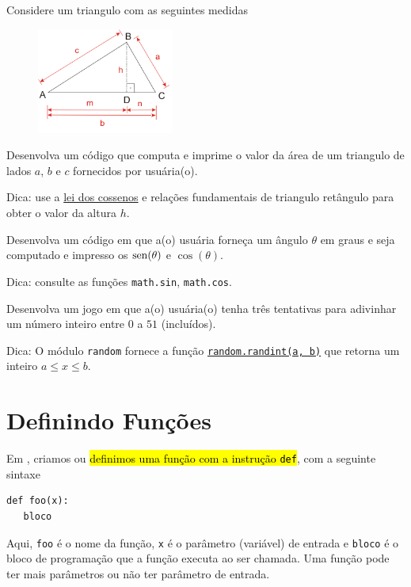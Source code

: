\begin{exer}
  Considere um triangulo com as seguintes medidas
  \begin{figure}[H]
    \centering
    \includegraphics[width=0.4\textwidth]{./cap_fun/dados/fig_leiDosCossenos/fig}
  \end{figure}
  Desenvolva um código que computa e imprime o valor da área de um triangulo de lados $a$, $b$ e $c$ fornecidos por usuária(o).
\end{exer}
\begin{resp}
  Dica: use a \href{https://pt.wikipedia.org/wiki/Lei_dos_cossenos}{lei dos cossenos} e relações fundamentais de triangulo retângulo para obter o valor da altura $h$. 
\end{resp}

\begin{exer}
  Desenvolva um código em que a(o) usuária forneça um ângulo $\theta$ em graus e seja computado e impresso os $\operatorname{sen}(\theta)$ e $\cos(\theta)$.
\end{exer}
\begin{resp}
  Dica: consulte as funções \lstinline+math.sin+, \lstinline+math.cos+.
\end{resp}

\begin{exer}
  Desenvolva um jogo em que a(o) usuária(o) tenha três tentativas para adivinhar um número inteiro entre $0$ a $51$ (incluídos). 
\end{exer}
\begin{resp}
  Dica: O módulo \lstinline+random+ fornece a função \href{https://docs.python.org/3/library/random.html?highlight=random#random.randint}{\lstinline+random.randint(a, b)+} que retorna um inteiro $a \leq x \leq b$.
\end{resp}

\section{Definindo Funções}\label{cap_fun_sec_def}

Em {\python}, criamos ou \hl{definimos uma função com a instrução {\lstinline+def+}}, com a seguinte sintaxe
\begin{lstlisting}
def foo(x):
   bloco
\end{lstlisting}
Aqui, \lstinline+foo+ é o nome da função, \lstinline+x+ é o parâmetro (variável) de entrada e \lstinline+bloco+ é o bloco de programação que a função executa ao ser chamada. Uma função pode ter mais parâmetros ou não ter parâmetro de entrada.

